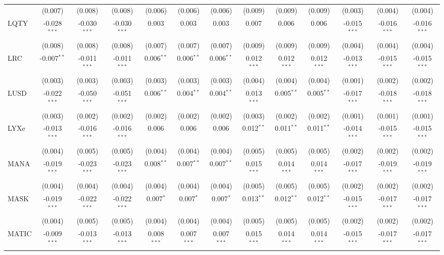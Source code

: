 \begin{table}[!htbp]
\begin{tabular}{@{\extracolsep{5pt}}lcccccccccccc}
  & (0.007) & (0.008) & (0.008) & (0.006) & (0.006) & (0.006) & (0.009) & (0.009) & (0.009) & (0.003) & (0.004) & (0.004) \\
 LQTY & -0.028$^{***}$ & -0.030$^{***}$ & -0.030$^{***}$ & 0.003$^{}$ & 0.003$^{}$ & 0.003$^{}$ & 0.007$^{}$ & 0.006$^{}$ & 0.006$^{}$ & -0.015$^{***}$ & -0.016$^{***}$ & -0.016$^{***}$ \\
  & (0.008) & (0.008) & (0.008) & (0.007) & (0.007) & (0.007) & (0.009) & (0.009) & (0.009) & (0.004) & (0.004) & (0.004) \\
 LRC & -0.007$^{**}$ & -0.011$^{***}$ & -0.011$^{***}$ & 0.006$^{**}$ & 0.006$^{**}$ & 0.006$^{**}$ & 0.012$^{***}$ & 0.012$^{***}$ & 0.012$^{***}$ & -0.013$^{***}$ & -0.015$^{***}$ & -0.015$^{***}$ \\
  & (0.003) & (0.003) & (0.003) & (0.003) & (0.003) & (0.003) & (0.004) & (0.004) & (0.004) & (0.001) & (0.002) & (0.002) \\
 LUSD & -0.022$^{***}$ & -0.050$^{***}$ & -0.051$^{***}$ & 0.006$^{**}$ & 0.004$^{**}$ & 0.004$^{**}$ & 0.013$^{***}$ & 0.005$^{**}$ & 0.005$^{**}$ & -0.017$^{***}$ & -0.018$^{***}$ & -0.018$^{***}$ \\
  & (0.003) & (0.002) & (0.002) & (0.002) & (0.002) & (0.002) & (0.003) & (0.002) & (0.002) & (0.001) & (0.001) & (0.001) \\
 LYXe & -0.013$^{***}$ & -0.016$^{***}$ & -0.016$^{***}$ & 0.006$^{}$ & 0.006$^{}$ & 0.006$^{}$ & 0.012$^{**}$ & 0.011$^{**}$ & 0.011$^{**}$ & -0.014$^{***}$ & -0.015$^{***}$ & -0.015$^{***}$ \\
  & (0.004) & (0.005) & (0.005) & (0.004) & (0.004) & (0.004) & (0.005) & (0.005) & (0.005) & (0.002) & (0.002) & (0.002) \\
 MANA & -0.019$^{***}$ & -0.023$^{***}$ & -0.023$^{***}$ & 0.008$^{**}$ & 0.007$^{**}$ & 0.007$^{**}$ & 0.015$^{***}$ & 0.014$^{***}$ & 0.014$^{***}$ & -0.017$^{***}$ & -0.019$^{***}$ & -0.019$^{***}$ \\
  & (0.004) & (0.004) & (0.004) & (0.004) & (0.004) & (0.004) & (0.005) & (0.005) & (0.005) & (0.002) & (0.002) & (0.002) \\
 MASK & -0.019$^{***}$ & -0.022$^{***}$ & -0.022$^{***}$ & 0.007$^{*}$ & 0.007$^{*}$ & 0.007$^{*}$ & 0.013$^{**}$ & 0.012$^{**}$ & 0.012$^{**}$ & -0.015$^{***}$ & -0.017$^{***}$ & -0.017$^{***}$ \\
  & (0.004) & (0.005) & (0.005) & (0.004) & (0.004) & (0.004) & (0.005) & (0.005) & (0.005) & (0.002) & (0.002) & (0.002) \\
 MATIC & -0.009$^{***}$ & -0.013$^{***}$ & -0.013$^{***}$ & 0.008$^{***}$ & 0.007$^{***}$ & 0.007$^{***}$ & 0.015$^{***}$ & 0.014$^{***}$ & 0.014$^{***}$ & -0.015$^{***}$ & -0.017$^{***}$ & -0.017$^{***}$ \\

\end{tabular}
\end{table}
